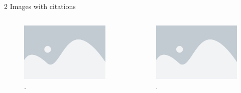 \begin{frame}{2 Images with citations}

    \begin{columns}
        \begin{figure}[h]
            \centering
            \includegraphics[width=1.1\textwidth]{resources/placeholder.png}
            \captionsetup{labelformat=empty}
            \caption{\citeauthor{fu_dual_2020}\cite{fu_dual_2020}.}
        \end{figure}

        \begin{figure}[h]
            \centering
            \includegraphics[width=1.1\textwidth]{resources/placeholder.png}
            \captionsetup{labelformat=empty}
            \caption{\citeauthor{khan_calibration_2016}\cite{khan_calibration_2016}.}
        \end{figure}
    \end{columns}
    
\end{frame}

